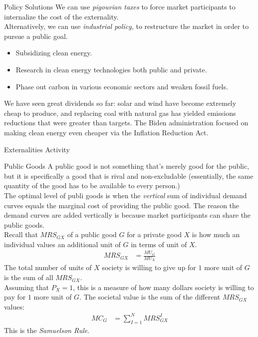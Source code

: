 \documentclass[8pt]{extarticle}
\begin{document}
  \begin{problem}{Policy Solutions}
    We can use \textit{pigouvian taxes} to force market participants to internalize the cost of the externality.\\

    Alternatively, we can use \textit{industrial policy}, to restructure the market in order to pursue a public goal.
    \begin{itemize}
      \item Subsidizing clean energy.
      \item Research in clean energy technologies both public and private.
      \item Phase out carbon in various economic sectors and weaken fossil fuels.
    \end{itemize}
    We have seen great dividends so far: solar and wind have become extremely cheap to produce, and replacing coal with natural gas has yielded emissions reductions that were greater than targets. The Biden administration focused on making clean energy even cheaper via the Inflation Reduction Act.
  \end{problem}
  \begin{problem}{Externalities Activity}
    \begin{tcbraster}[raster columns = 1,colframe = black!75!white,colback=white]
    \end{tcbraster}
  \end{problem}
  \begin{problem}{Public Goods}
    A public good is not something that's merely good for the public, but it is specifically a good that is rival and non-excludable (essentially, the same quantity of the good has to be available to every person.)\\

    The optimal level of publi goods is when the \textit{vertical} sum of individual demand curves equals the marginal cost of providing the public good. The reason the demand curves are added vertically is because market participants can share the public goods.\\

    Recall that $MRS_{GX}$ of a public good $G$ for a private good $X$ is how much an individual values an additional unit of $G$ in terms of unit of $X$.
    \begin{align*}
      MRS_{GX} &= \frac{MU_G}{MU_X}
    \end{align*}
    The total number of units of $X$ society is willing to give up for $1$ more unit of $G$ is the sum of all $MRS_{GX}$.\\

    Assuming that $P_X = 1$, this is a measure of how many dollars society is willing to pay for $1$ more unit of $G$. The societal value is the sum of the different $MRS_{GX}$ values:
    \begin{align*}
      MC_G &= \sum_{I=1}^{N} MRS_{GX}^I
    \end{align*}
    This is the \textit{Samuelson Rule}.
  \end{problem}
\end{document}
